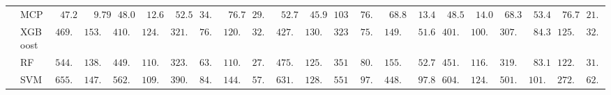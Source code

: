 \begin{tabular}{p{0.2cm}p{1cm}|p{0.6cm}p{0.6cm}|p{0.6cm}p{0.6cm}p{0.6cm}p{0.6cm}p{0.6cm}p{0.6cm}|p{0.6cm}p{0.6cm}p{0.6cm}p{0.6cm}p{0.6cm}p{0.6cm}|p{0.6cm}p{0.6cm}p{0.6cm}p{0.6cm}p{0.6cm}p{0.6cm}}
 & MCP  & $\phantom{0}47.24$ & $\phantom{00}9.79$ & $\phantom{0}48.09$ & $\phantom{0}12.66$ & $\phantom{0}52.55$ & $34.03$ & $\phantom{0}76.73$ & $29.56$ & $\phantom{0}52.76$ & $\phantom{0}45.99$ & $103.71$ & $76.00$ & $\phantom{0}68.85$ & $\phantom{0}13.43$ & $\phantom{0}48.56$ & $\phantom{0}14.01$ & $\phantom{0}68.31$ & $\phantom{0}53.44$ & $\phantom{0}76.72$ & $21.48$ \\
 & XGBoost  & $469.79$ & $153.10$ & $410.24$ & $124.20$ & $321.26$ & $76.75$ & $120.60$ & $32.85$ & $427.40$ & $130.84$ & $323.66$ & $75.19$ & $149.85$ & $\phantom{0}51.63$ & $401.51$ & $100.54$ & $307.25$ & $\phantom{0}84.34$ & $125.67$ & $32.82$ \\
 & RF  & $544.40$ & $138.21$ & $449.51$ & $110.71$ & $323.89$ & $63.22$ & $110.63$ & $27.86$ & $475.33$ & $125.96$ & $351.50$ & $80.88$ & $155.18$ & $\phantom{0}52.79$ & $451.61$ & $116.15$ & $319.99$ & $\phantom{0}83.11$ & $122.12$ & $31.12$ \\
 & SVM  & $655.31$ & $147.70$ & $562.14$ & $109.84$ & $390.52$ & $84.30$ & $144.29$ & $57.22$ & $631.61$ & $128.77$ & $551.01$ & $97.28$ & $448.94$ & $\phantom{0}97.82$ & $604.68$ & $124.27$ & $501.74$ & $101.37$ & $272.56$ & $62.96$ \\
\hline 
\end{tabular}


